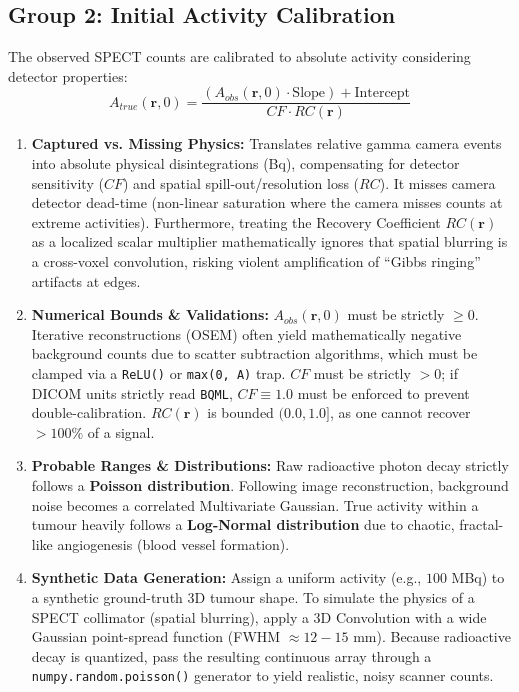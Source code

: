 \documentclass[11pt,a4paper]{article}
\begin{document}
\subsection{Group 2: Initial Activity Calibration}

The observed SPECT counts are calibrated to absolute activity considering detector properties:
\begin{equation}
    A_{true}(\mathbf{r}, 0) = \frac{(A_{obs}(\mathbf{r}, 0) \cdot \text{Slope}) + \text{Intercept}}{CF \cdot RC(\mathbf{r})}
\end{equation}

\begin{enumerate}
    \item \textbf{Captured vs. Missing Physics:} Translates relative gamma camera events into absolute physical disintegrations (Bq), compensating for detector sensitivity ($CF$) and spatial spill-out/resolution loss ($RC$). It misses camera detector dead-time (non-linear saturation where the camera misses counts at extreme activities). Furthermore, treating the Recovery Coefficient $RC(\mathbf{r})$ as a localized scalar multiplier mathematically ignores that spatial blurring is a cross-voxel convolution, risking violent amplification of ``Gibbs ringing'' artifacts at edges.
    \item \textbf{Numerical Bounds \& Validations:} $A_{obs}(\mathbf{r},0)$ must be strictly $\ge 0$. Iterative reconstructions (OSEM) often yield mathematically negative background counts due to scatter subtraction algorithms, which must be clamped via a \texttt{ReLU()} or \texttt{max(0, A)} trap. $CF$ must be strictly $> 0$; if DICOM units strictly read \texttt{BQML}, $CF \equiv 1.0$ must be enforced to prevent double-calibration. $RC(\mathbf{r})$ is bounded $(0.0, 1.0]$, as one cannot recover $>100\%$ of a signal.
    \item \textbf{Probable Ranges \& Distributions:} Raw radioactive photon decay strictly follows a \textbf{Poisson distribution}. Following image reconstruction, background noise becomes a correlated Multivariate Gaussian. True activity within a tumour heavily follows a \textbf{Log-Normal distribution} due to chaotic, fractal-like angiogenesis (blood vessel formation).
    \item \textbf{Synthetic Data Generation:} Assign a uniform activity (e.g., $100$ MBq) to a synthetic ground-truth 3D tumour shape. To simulate the physics of a SPECT collimator (spatial blurring), apply a 3D Convolution with a wide Gaussian point-spread function (FWHM $\approx 12-15$ mm). Because radioactive decay is quantized, pass the resulting continuous array through a \texttt{numpy.random.poisson()} generator to yield realistic, noisy scanner counts.
\end{enumerate}
\end{document}
